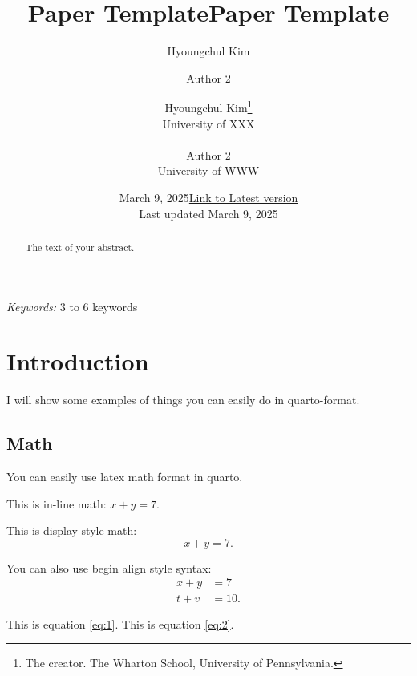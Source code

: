 \documentclass[
  11pt]{article}
\title{Paper Template}
\author{Hyoungchul Kim \and Author 2}
\date{March 9, 2025}
\begin{document}
\def\spacingset#1{\renewcommand{\baselinestretch}%
{#1}\small\normalsize} \spacingset{1}



\date{\href{https://hchulkim.github.io}{Link to Latest version}\\ \vspace{1em} Last updated March
9, 2025}
\title{Paper Template}
\author{
Hyoungchul Kim\thanks{The creator. The Wharton School, University of
Pennsylvania.}\\
University of XXX\\
\\Author 2\\
University of WWW\\
}
\maketitle

\bigskip
\bigskip
\begin{abstract}
The text of your abstract.
\end{abstract}

\noindent%
{\it Keywords:} 3 to 6 keywords
\vfill

\newpage
\spacingset{1.2} %

\section{Introduction}\label{sec-intro}

I will show some examples of things you can easily do in quarto-format.

\subsection{Math}\label{math}

You can easily use latex math format in quarto.

This is in-line math: \(x + y = 7\).

This is display-style math: \[x + y = 7.\]

You can also use begin align style syntax: \begin{align}
  x + y &= 7\label{eq:1}\\
  t + v &= 10.\label{eq:2}
\end{align}

This is equation \ref{eq:1}. This is equation \ref{eq:2}.
\end{document}
